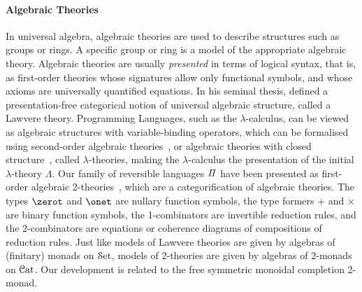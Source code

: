 \paragraph{Algebraic Theories} In universal algebra, algebraic theories are used to describe structures such as groups
or rings. A specific group or ring is a model of the appropriate algebraic theory. Algebraic theories are usually
\emph{presented} in terms of logical syntax, that is, as first-order theories whose signatures allow only functional
symbols, and whose axioms are universally quantified equations. In his seminal thesis,
\citet{lawvereFUNCTORIALSEMANTICSALGEBRAIC1963} defined a presentation-free categorical notion of universal algebraic
structure, called a Lawvere theory. Programming Languages, such as the $\lambda$-calculus, can be viewed as algebraic
structures with variable-binding operators, which can be formalised using second-order algebraic
theories~\cite{fioreSecondOrderAlgebraicTheories2010}, or algebraic theories with closed
structure~\cite{hylandClassicalLambdaCalculus2017}, called $\lambda$-theories, making the $\lambda$-calculus the
presentation of the initial $\lambda$-theory $\Lambda$. Our family of reversible languages $\mathit{\Pi}$ have been presented
as first-order algebraic
2-theories~\cite{cohenCoherenceRewriting2theories2009,bekeCategorificationTermRewriting2011,yanofskySyntaxCoherence2000},
which are a categorification of algebraic theories. The types $\zerot$ and $\onet$ are nullary function symbols, the
type formers $+$ and $\times$ are binary function symbols, the 1-combinators are invertible reduction rules, and the
2-combinators are equations or coherence diagrams of compositions of reduction rules. Just like models of Lawvere
theories are given by algebras of (finitary) monads on $\SetCat$, models of 2-theories are given by algebras of 2-monads
on $\CatCat$. Our development is related to the free symmetric monoidal completion 2-monad.

